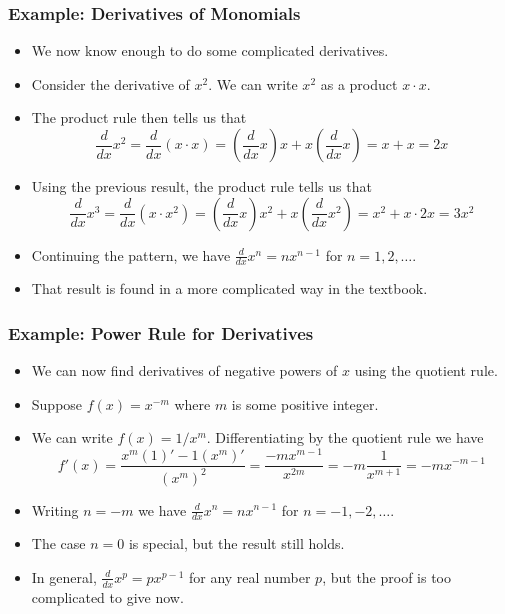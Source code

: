 \documentclass[serif,ignorenonframetext]{beamer}
\newcommand{\ds}{\displaystyle}
\begin{document}
\begin{frame}
  \frametitle{Example: Derivatives of Monomials}
  \begin{itemize}[<+->]
  \item We now know enough to do some complicated 
    derivatives.
  \item Consider the derivative of $x^2$.  We can write
    $x^2$ as a product $x\cdot x$.
  \item The product rule then tells us that
    \begin{displaymath}
      \frac{d}{dx} x^2 = \frac{d}{dx} (x\cdot x)
      = \left( \frac{d}{dx} x \right) x + x \left(\frac{d}{dx} x\right)
      = x + x = 2x
    \end{displaymath}
  \item Using the previous result, the product rule tells us that
    \begin{displaymath}
      \frac{d}{dx} x^3 = \frac{d}{dx} (x\cdot x^2)
      = \left(\frac{d}{dx} x \right) x^2 + x\left(\frac{d}{dx} x^2\right)
      = x^2 + x\cdot 2x = 3x^2
    \end{displaymath}
  \item Continuing the pattern, we have $\ds \frac{d}{dx} x^n = nx^{n-1}$
    for $n=1,2,\ldots$.
  \item That result is found in a more complicated way in the textbook.
  \end{itemize}
\end{frame}

\begin{frame}
  \frametitle{Example: Power Rule for Derivatives}
  \begin{itemize}[<+->]
  \item We can now find derivatives of negative powers of $x$ using
    the quotient rule.
  \item Suppose $f(x) = x^{-m}$ where $m$ is some positive integer.
  \item We can write $f(x)=1/x^m$.  Differentiating by the quotient rule
    we have 
    \begin{displaymath}
      f'(x) = \frac{x^m (1)' - 1 (x^m)'}{(x^{m})^2}
      = \frac{-mx^{m-1}}{x^{2m}}
      = -m\frac{1}{x^{m+1}}
      = -mx^{-m-1}
    \end{displaymath}
  \item Writing $n=-m$ we have $\ds \frac{d}{dx} x^n = nx^{n-1}$ for 
    $n=-1,-2,\ldots$.
  \item The case $n=0$ is special, but the result still holds.
  \item In general, $\ds\frac{d}{dx} x^p = px^{p-1}$ for any real number
    $p$, but the proof is too complicated to give now.
  \end{itemize}
\end{frame}
\end{document}
